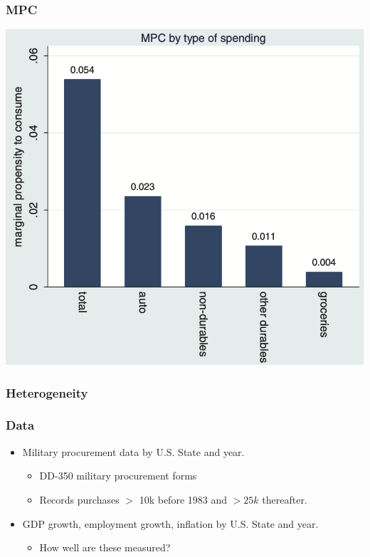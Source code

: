 \documentclass[english,xcolor=svgnames]{beamer}
\begin{document}
\begin{frame}
\frametitle[alignment=center]{MPC}
\centering
\includegraphics[scale=0.6]{figures/MRSFIG4b.png}
\end{frame}


\begin{frame}
\frametitle[alignment=center]{Heterogeneity}

\end{frame}


\begin{frame}
\frametitle[alignment=center]{Data}
\begin{itemize}
	\item Military procurement data by U.S. State and year.
	\begin{itemize}
		\item  DD-350 military procurement forms
		\item Records purchases $>$ 10k before 1983 and $>25k$ thereafter.
	\end{itemize}	
	\item GDP growth, employment growth, inflation by U.S. State and year.
	\begin{itemize}
		\item How well are these measured?
	\end{itemize}
\end{itemize}
\end{frame}
\end{document}
